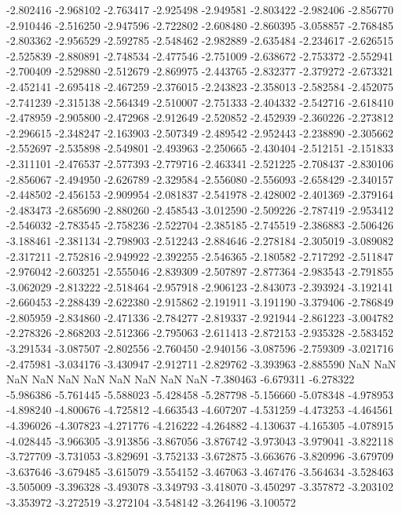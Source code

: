-2.802416
-2.968102
-2.763417
-2.925498
-2.949581
-2.803422
-2.982406
-2.856770
-2.910446
-2.516250
-2.947596
-2.722802
-2.608480
-2.860395
-3.058857
-2.768485
-2.803362
-2.956529
-2.592785
-2.548462
-2.982889
-2.635484
-2.234617
-2.626515
-2.525839
-2.880891
-2.748534
-2.477546
-2.751009
-2.638672
-2.753372
-2.552941
-2.700409
-2.529880
-2.512679
-2.869975
-2.443765
-2.832377
-2.379272
-2.673321
-2.452141
-2.695418
-2.467259
-2.376015
-2.243823
-2.358013
-2.582584
-2.452075
-2.741239
-2.315138
-2.564349
-2.510007
-2.751333
-2.404332
-2.542716
-2.618410
-2.478959
-2.905800
-2.472968
-2.912649
-2.520852
-2.452939
-2.360226
-2.273812
-2.296615
-2.348247
-2.163903
-2.507349
-2.489542
-2.952443
-2.238890
-2.305662
-2.552697
-2.535898
-2.549801
-2.493963
-2.250665
-2.430404
-2.512151
-2.151833
-2.311101
-2.476537
-2.577393
-2.779716
-2.463341
-2.521225
-2.708437
-2.830106
-2.856067
-2.494950
-2.626789
-2.329584
-2.556080
-2.556093
-2.658429
-2.340157
-2.448502
-2.456153
-2.909954
-2.081837
-2.541978
-2.428002
-2.401369
-2.379164
-2.483473
-2.685690
-2.880260
-2.458543
-3.012590
-2.509226
-2.787419
-2.953412
-2.546032
-2.783545
-2.758236
-2.522704
-2.385185
-2.745519
-2.386883
-2.506426
-3.188461
-2.381134
-2.798903
-2.512243
-2.884646
-2.278184
-2.305019
-3.089082
-2.317211
-2.752816
-2.949922
-2.392255
-2.546365
-2.180582
-2.717292
-2.511847
-2.976042
-2.603251
-2.555046
-2.839309
-2.507897
-2.877364
-2.983543
-2.791855
-3.062029
-2.813222
-2.518464
-2.957918
-2.906123
-2.843073
-2.393924
-3.192141
-2.660453
-2.288439
-2.622380
-2.915862
-2.191911
-3.191190
-3.379406
-2.786849
-2.805959
-2.834860
-2.471336
-2.784277
-2.819337
-2.921944
-2.861223
-3.004782
-2.278326
-2.868203
-2.512366
-2.795063
-2.611413
-2.872153
-2.935328
-2.583452
-3.291534
-3.087507
-2.802556
-2.760450
-2.940156
-3.087596
-2.759309
-3.021716
-2.475981
-3.034176
-3.430947
-2.912711
-2.829762
-3.393963
-2.885590
NaN
NaN
NaN
NaN
NaN
NaN
NaN
NaN
NaN
NaN
-7.380463
-6.679311
-6.278322
-5.986386
-5.761445
-5.588023
-5.428458
-5.287798
-5.156660
-5.078348
-4.978953
-4.898240
-4.800676
-4.725812
-4.663543
-4.607207
-4.531259
-4.473253
-4.464561
-4.396026
-4.307823
-4.271776
-4.216222
-4.264882
-4.130637
-4.165305
-4.078915
-4.028445
-3.966305
-3.913856
-3.867056
-3.876742
-3.973043
-3.979041
-3.822118
-3.727709
-3.731053
-3.829691
-3.752133
-3.672875
-3.663676
-3.820996
-3.679709
-3.637646
-3.679485
-3.615079
-3.554152
-3.467063
-3.467476
-3.564634
-3.528463
-3.505009
-3.396328
-3.493078
-3.349793
-3.418070
-3.450297
-3.357872
-3.203102
-3.353972
-3.272519
-3.272104
-3.548142
-3.264196
-3.100572
